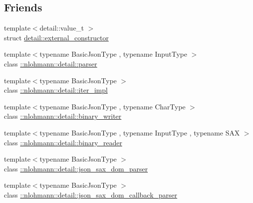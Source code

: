 \subsection*{Friends}
\begin{DoxyCompactItemize}
\item 
{\footnotesize template$<$detail\+::value\+\_\+t $>$ }\\struct \hyperlink{classnlohmann_1_1basic__json_a6275ed57bae6866cdf5db5370a7ad47c}{detail\+::external\+\_\+constructor}
\item 
{\footnotesize template$<$typename Basic\+Json\+Type , typename Input\+Type $>$ }\\class \hyperlink{classnlohmann_1_1basic__json_ac8f3125911eb018ef4ab00d879487baf}{\+::nlohmann\+::detail\+::parser}
\item 
{\footnotesize template$<$typename Basic\+Json\+Type $>$ }\\class \hyperlink{classnlohmann_1_1basic__json_a842e5c7ca096025c18b11e715d3401f4}{\+::nlohmann\+::detail\+::iter\+\_\+impl}
\item 
{\footnotesize template$<$typename Basic\+Json\+Type , typename Char\+Type $>$ }\\class \hyperlink{classnlohmann_1_1basic__json_a69d491bbda88ade6d3c7a2b11309e8bf}{\+::nlohmann\+::detail\+::binary\+\_\+writer}
\item 
{\footnotesize template$<$typename Basic\+Json\+Type , typename Input\+Type , typename S\+AX $>$ }\\class \hyperlink{classnlohmann_1_1basic__json_aa226ed5103dfd10e27e562d35a3a106b}{\+::nlohmann\+::detail\+::binary\+\_\+reader}
\item 
{\footnotesize template$<$typename Basic\+Json\+Type $>$ }\\class \hyperlink{classnlohmann_1_1basic__json_a47aabb1eceae32e8a6e8e7f0ff34be60}{\+::nlohmann\+::detail\+::json\+\_\+sax\+\_\+dom\+\_\+parser}
\item 
{\footnotesize template$<$typename Basic\+Json\+Type $>$ }\\class \hyperlink{classnlohmann_1_1basic__json_a95574da8d12905ea99dc348934c837da}{\+::nlohmann\+::detail\+::json\+\_\+sax\+\_\+dom\+\_\+callback\+\_\+parser}
\end{DoxyCompactItemize}
